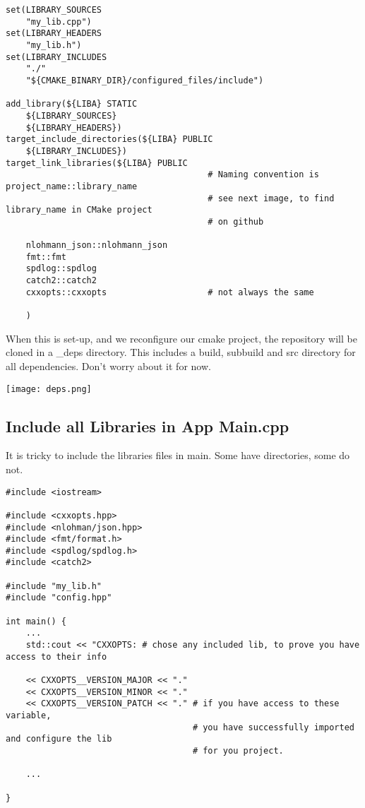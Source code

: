\begin{verbatim}
set(LIBRARY_SOURCES
    "my_lib.cpp")
set(LIBRARY_HEADERS
    "my_lib.h")
set(LIBRARY_INCLUDES
    "./"
    "${CMAKE_BINARY_DIR}/configured_files/include")

add_library(${LIBA} STATIC
    ${LIBRARY_SOURCES}
    ${LIBRARY_HEADERS})
target_include_directories(${LIBA} PUBLIC
    ${LIBRARY_INCLUDES})
target_link_libraries(${LIBA} PUBLIC
                                        # Naming convention is project_name::library_name
                                        # see next image, to find library_name in CMake project
                                        # on github
    
    nlohmann_json::nlohmann_json
    fmt::fmt
    spdlog::spdlog
    catch2::catch2
    cxxopts::cxxopts                    # not always the same

    )
\end{verbatim}

When this is set-up, and we reconfigure our cmake project, the repository will be cloned in a \_deps directory. This includes
a build, subbuild and src directory for all dependencies. Don't worry about it for now.

\begin{center}
    \texttt{[image: deps.png]}
\end{center}


\subsection{Include all Libraries in App Main.cpp}

It is tricky to include the libraries files in main. Some have directories, some do not.

\begin{verbatim}
#include <iostream>

#include <cxxopts.hpp>
#include <nlohman/json.hpp>
#include <fmt/format.h>
#include <spdlog/spdlog.h>
#include <catch2>

#include "my_lib.h"
#include "config.hpp"

int main() {
    ...
    std::cout << "CXXOPTS: # chose any included lib, to prove you have access to their info

    << CXXOPTS__VERSION_MAJOR << "."
    << CXXOPTS__VERSION_MINOR << "."
    << CXXOPTS__VERSION_PATCH << "." # if you have access to these variable, 
                                     # you have successfully imported and configure the lib
                                     # for you project.

    ...

}
\end{verbatim}


